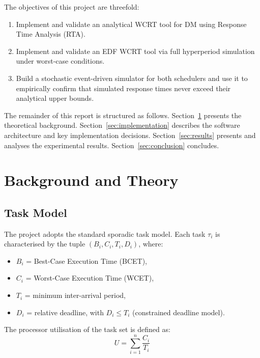 \documentclass[12pt,a4paper]{article}
\begin{document}
The objectives of this project are threefold:
\begin{enumerate}
    \item Implement and validate an analytical WCRT tool for DM using Response Time Analysis (RTA).
    \item Implement and validate an EDF WCRT tool via full hyperperiod simulation under worst-case conditions.
    \item Build a stochastic event-driven simulator for both schedulers and use it to empirically confirm that simulated response times never exceed their analytical upper bounds.
\end{enumerate}

The remainder of this report is structured as follows. Section~\ref{sec:background} presents the theoretical background. Section~\ref{sec:implementation} describes the software architecture and key implementation decisions. Section~\ref{sec:results} presents and analyses the experimental results. Section~\ref{sec:conclusion} concludes.

\section{Background and Theory}
\label{sec:background}

\subsection{Task Model}

The project adopts the standard sporadic task model. Each task \(\tau_i\) is characterised by the tuple \((B_i, C_i, T_i, D_i)\), where:
\begin{itemize}
    \item \(B_i\) = Best-Case Execution Time (BCET),
    \item \(C_i\) = Worst-Case Execution Time (WCET),
    \item \(T_i\) = minimum inter-arrival period,
    \item \(D_i\) = relative deadline, with \(D_i \leq T_i\) (constrained deadline model).
\end{itemize}
The processor utilisation of the task set is defined as:
\begin{equation}
    U = \sum_{i=1}^{n} \frac{C_i}{T_i}
    \label{eq:utilisation}
\end{equation}
\end{document}
